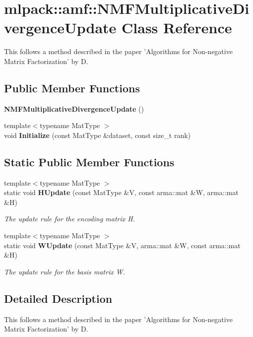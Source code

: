 \section{mlpack\-:\-:amf\-:\-:N\-M\-F\-Multiplicative\-Divergence\-Update Class Reference}
\label{classmlpack_1_1amf_1_1NMFMultiplicativeDivergenceUpdate}


This follows a method described in the paper 'Algorithms for Non-\/negative Matrix Factorization' by D.  


\subsection*{Public Member Functions}
\begin{DoxyCompactItemize}
\item 
{\bf N\-M\-F\-Multiplicative\-Divergence\-Update} ()
\item 
{\footnotesize template$<$typename Mat\-Type $>$ }\\void {\bf Initialize} (const Mat\-Type \&dataset, const size\-\_\-t rank)
\end{DoxyCompactItemize}
\subsection*{Static Public Member Functions}
\begin{DoxyCompactItemize}
\item 
{\footnotesize template$<$typename Mat\-Type $>$ }\\static void {\bf H\-Update} (const Mat\-Type \&V, const arma\-::mat \&W, arma\-::mat \&H)
\begin{DoxyCompactList}\small\item\em The update rule for the encoding matrix H. \end{DoxyCompactList}\item 
{\footnotesize template$<$typename Mat\-Type $>$ }\\static void {\bf W\-Update} (const Mat\-Type \&V, arma\-::mat \&W, const arma\-::mat \&H)
\begin{DoxyCompactList}\small\item\em The update rule for the basis matrix W. \end{DoxyCompactList}\end{DoxyCompactItemize}


\subsection{Detailed Description}
This follows a method described in the paper 'Algorithms for Non-\/negative Matrix Factorization' by D. 


